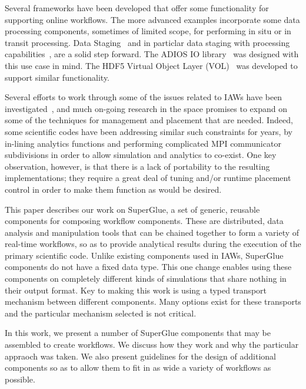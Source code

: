 \documentclass[conference]{IEEEtran}
\begin{document}
Several frameworks have been developed that offer some functionality for
supporting online workflows. The more advanced examples incorporate some data
processing components, sometimes of limited scope, for performing in situ or in
transit processing. Data Staging~\cite{nisar:2008:staging} and in particlar
data staging with processing
capabilities~\cite{abbasi:2009:datastaging,ober:seismic}, are a solid step
forward. The ADIOS IO library~\cite{lofstead:2009:adaptable} was designed with
this use case in mind. The HDF5 Virtual Object Layer
(VOL)~\cite{chaarawi:2013:hdf5-vol} was developed to support similar
functionality.

Several efforts to work through some of the issues related to IAWs have been
investigated~\cite{karimabadi:2013:catalyst,whitlock:2011:libsim,Glean,Flexpath,dreher:2016:bredala,zheng:2010:predata},
and much on-going research in the space promises to expand on some of the
techniques for management and placement that are needed.  Indeed, some
scientific codes have been addressing similar such constraints for years, by
in-lining analytics functions and performing complicated MPI communicator
subdivisions in order to allow simulation and analytics to co-exist.  One key
observation, however, is that there is a lack of portability to the resulting
implementations; they require a great deal of tuning and/or runtime placement
control in order to make them function as would be desired.

This paper describes our work on SuperGlue, a set of generic, reusable
components for composing workflow components. These are distributed, data
analysis and manipulation tools that can be chained together to form a variety
of real-time workflows, so as to provide analytical results during the
execution of the primary scientific code. Unlike existing components used in
IAWs, SuperGlue components do not have a fixed data type. This one change
enables using these components on completely different kinds of simulations
that share nothing in their output format. Key to making this work is using a
typed transport mechanism between different components. Many options exist for
these transports and the particular mechanism selected is not critical. 

In this work, we present a number of SuperGlue components that may be
assembled to create workflows. We discuss how they work and why the particular
appraoch was taken.  We also present guidelines for the design of additional
components so as to allow them to fit in as wide a variety of workflows as
possible. 
\end{document}

